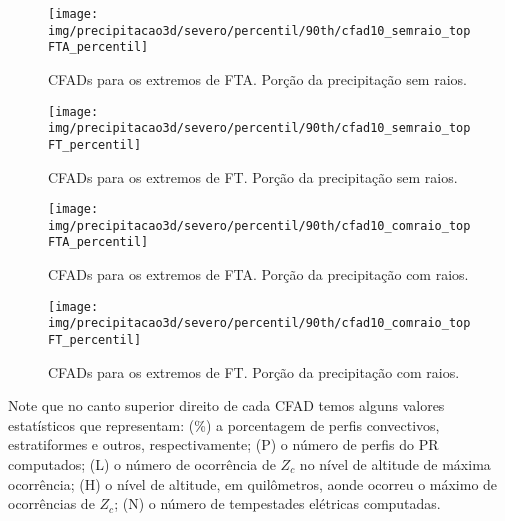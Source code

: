 \begin{sidewaysfigure}
\centering
\texttt{[image: img/precipitacao3d/severo/percentil/90th/cfad10\_semraio\_topFTA\_percentil]}
\caption{CFADs para os extremos de FTA. Porção da precipitação sem raios.}
\label{ftacfadwithout}
\end{sidewaysfigure} 
\begin{sidewaysfigure}
\centering
\texttt{[image: img/precipitacao3d/severo/percentil/90th/cfad10\_semraio\_topFT\_percentil]}
\caption{CFADs para os extremos de FT. Porção da precipitação sem raios.}
\label{ftcfadwithout}
\end{sidewaysfigure} 
\begin{sidewaysfigure}
  \centering
  \texttt{[image: img/precipitacao3d/severo/percentil/90th/cfad10\_comraio\_topFTA\_percentil]}
  \caption{CFADs para os extremos de FTA. Porção da precipitação com raios.}
  \label{ftacfadwith}   
\end{sidewaysfigure} 
\begin{sidewaysfigure}
  \centering
  \texttt{[image: img/precipitacao3d/severo/percentil/90th/cfad10\_comraio\_topFT\_percentil]}
  \caption{CFADs para os extremos de FT. Porção da precipitação com raios.}
  \label{ftcfadwith}   
\end{sidewaysfigure} 

Note que no canto superior direito de cada CFAD temos alguns valores estatísticos que representam: (\%)  a porcentagem de perfis convectivos, estratiformes e outros, respectivamente; (P) o número de perfis do PR computados; (L) o número de ocorrência de $Z_c$ no nível de altitude de máxima ocorrência; (H) o nível de altitude, em quilômetros, aonde ocorreu o máximo de ocorrências de $Z_c$; (N) o número de tempestades elétricas computadas.


